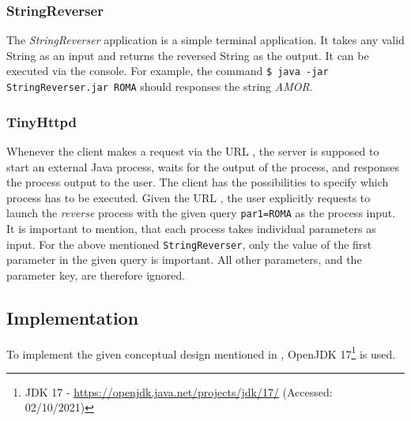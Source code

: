 \subsubsection{StringReverser}\label{subsubsec:01_part1_design_stringreverser}
The \textit{StringReverser} application is a simple terminal application. It takes any valid String as an input and returns the reversed String as the output. It can be executed via the console. For example, the command \texttt{\$ java -jar StringReverser.jar ROMA} should responses the string \textit{AMOR}.

\subsubsection{TinyHttpd}\label{subsubsec:01_part1_design_tinyhttpd}
Whenever the client makes a request via the URL , the server is supposed to start an external Java process, waits for the output of the process, and responses the process output to the user.
The client has the possibilities to specify which process has to be executed. Given the URL , the user explicitly requests to launch the \textit{reverse} process with the given query \texttt{par1=ROMA} as the process input.
It is important to mention, that each process takes individual parameters as input. For the above mentioned \texttt{StringReverser}, only the value of the first parameter in the given query is important. All other parameters, and the parameter key, are therefore ignored.


\newpage
\subsection{Implementation}\label{subsec:01_part1_impl}
To implement the given conceptual design mentioned in , OpenJDK 17\footnote{JDK 17 - \url{https://openjdk.java.net/projects/jdk/17/} (Accessed: 02/10/2021)} is used.

